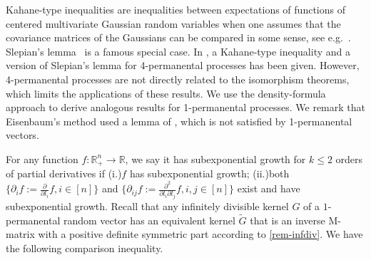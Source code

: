\documentclass[a4paper, 11pt]{article}
\begin{document}
Kahane-type inequalities are inequalities between expectations of functions of centered multivariate Gaussian random variables when one assumes that the covariance matrices of the Gaussians can be compared in some sense, see e.g.~\cite[Lecture 5]{biskup17}. Slepian's lemma~\cite{biskup17, slepian62} is a famous special case. In \cite{eisenbaum13}, a Kahane-type inequality and a version of Slepian's lemma for 4-permanental processes has been given. However, 4-permanental processes are not directly related to the isomorphism theorems, which limits the applications of these results. We use the density-formula approach to derive analogous results for 1-permanental processes. We remark that Eisenbaum's method used a lemma of \cite{sato99}, which is not satisfied by 1-permanental vectors.

For any function $f:\mathbb{R}_+^n\rightarrow \mathbb{R}$, we say it has subexponential growth for $k\leq 2$ orders of partial derivatives if (i.)$f$ has subexponential growth; (ii.)both $\{\partial_i f :=\frac{\partial}{\partial l_i}f, i\in [n]\}$ and $\{\partial_{ij} f :=\frac{\partial^2}{\partial l_i\partial l_j}f, i,j\in [n]\}$ exist and have subexponential growth. Recall that any infinitely divisible kernel $G$ of a $1$-permanental random vector has an equivalent kernel $\tilde{G}$ that is an inverse M-matrix with a positive definite symmetric part according to \cref{rem-infdiv}. We have the following comparison inequality.
\end{document}
